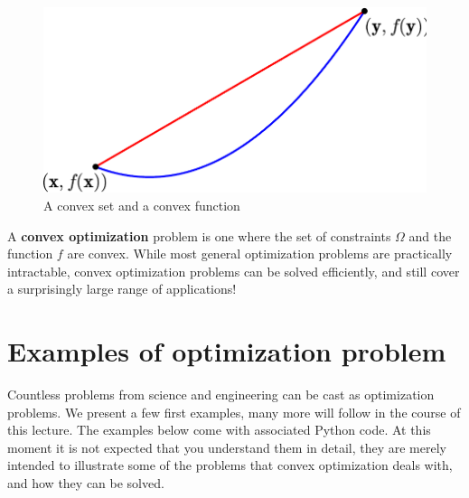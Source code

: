 \begin{figure}
\centering
\begin{minipage}{0.45\textwidth}
\end{minipage}
%
\begin{minipage}{0.45\textwidth}
\includegraphics[width=1.0\textwidth]{images/convf-crop.pdf}
\end{minipage}
\caption{A convex set and a convex function}
\end{figure}

A \textbf{convex optimization} problem is one where the set of constraints $\Omega$ and the function $f$ are convex. While most general optimization problems are practically intractable, convex optimization problems can be solved efficiently, and still cover a surprisingly large range of applications!

\section{Examples of optimization problem}
Countless problems from science and engineering can be cast as optimization problems. We present a few first examples, many more will follow in the course of this lecture. The examples below come with associated Python code. At this moment it is not expected that you understand them in detail, they are merely intended to illustrate some of the problems that convex optimization deals with, and how they can be solved.

